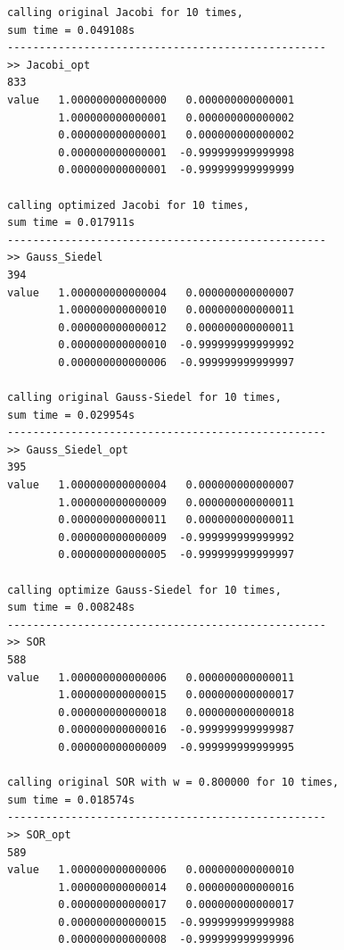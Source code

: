 \documentclass[12pt,a4paper,utf8]{ctexart}
\begin{document}
\begin{enumerate}
\begin{itemize}
\begin{lstlisting}
calling original Jacobi for 10 times, 
sum time = 0.049108s
--------------------------------------------------
>> Jacobi_opt
833     
value   1.000000000000000   0.000000000000001   
        1.000000000000001   0.000000000000002   
        0.000000000000001   0.000000000000002   
        0.000000000000001  -0.999999999999998   
        0.000000000000001  -0.999999999999999
          
calling optimized Jacobi for 10 times, 
sum time = 0.017911s
--------------------------------------------------
>> Gauss_Siedel
394     
value   1.000000000000004   0.000000000000007   
        1.000000000000010   0.000000000000011   
        0.000000000000012   0.000000000000011   
        0.000000000000010  -0.999999999999992   
        0.000000000000006  -0.999999999999997

calling original Gauss-Siedel for 10 times,
sum time = 0.029954s
--------------------------------------------------
>> Gauss_Siedel_opt
395     
value   1.000000000000004   0.000000000000007   
        1.000000000000009   0.000000000000011   
        0.000000000000011   0.000000000000011   
        0.000000000000009  -0.999999999999992   
        0.000000000000005  -0.999999999999997

calling optimize Gauss-Siedel for 10 times,
sum time = 0.008248s
--------------------------------------------------
>> SOR
588     
value   1.000000000000006   0.000000000000011
        1.000000000000015   0.000000000000017   
        0.000000000000018   0.000000000000018   
        0.000000000000016  -0.999999999999987   
        0.000000000000009  -0.999999999999995

calling original SOR with w = 0.800000 for 10 times,
sum time = 0.018574s
--------------------------------------------------
>> SOR_opt
589     
value   1.000000000000006   0.000000000000010
        1.000000000000014   0.000000000000016   
        0.000000000000017   0.000000000000017   
        0.000000000000015  -0.999999999999988   
        0.000000000000008  -0.999999999999996


\end{lstlisting}
\end{itemize}
\end{enumerate}
\end{document}
